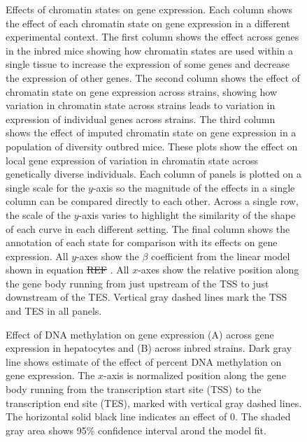 \documentclass[10pt,letterpaper]{article}
\providecommand{\DIFaddtex}[1]{{\protect\color{blue}\uwave{#1}}} %
\providecommand{\DIFdeltex}[1]{{\protect\color{red}\sout{#1}}}                      %
\providecommand{\DIFaddFL}[1]{\DIFadd{#1}} %
\providecommand{\DIFdelFL}[1]{\DIFdel{#1}} %
\providecommand{\DIFaddbeginFL}{} %
\providecommand{\DIFaddendFL}{} %
\providecommand{\DIFdelbeginFL}{} %
\providecommand{\DIFdelendFL}{} %
\providecommand{\DIFadd}[1]{\texorpdfstring{\DIFaddtex{#1}}{#1}} %
\providecommand{\DIFdel}[1]{\texorpdfstring{\DIFdeltex{#1}}{}} %
\newcommand{\DIFscaledelfig}{0.5}
\newlength{\DIFdelgraphicswidth} %
\newlength{\DIFdelgraphicsheight} %
\newcommand{\DIFaddincludegraphics}[2][]{{\color{blue}\fbox{\DIFOincludegraphics[#1]{#2}}}} %
\newcommand{\DIFdelincludegraphics}[2][]{%
\sbox{\DIFdelgraphicsbox}{\DIFOincludegraphics[#1]{#2}}%
\settoboxwidth{\DIFdelgraphicswidth}{\DIFdelgraphicsbox} %
\settoboxtotalheight{\DIFdelgraphicsheight}{\DIFdelgraphicsbox} %
\scalebox{\DIFscaledelfig}{%
\parbox[b]{\DIFdelgraphicswidth}{\usebox{\DIFdelgraphicsbox}\\[-\baselineskip] \rule{\DIFdelgraphicswidth}{0em}}\llap{\resizebox{\DIFdelgraphicswidth}{\DIFdelgraphicsheight}{%
\setlength{\unitlength}{\DIFdelgraphicswidth}%
\begin{picture}(1,1)%
\thicklines\linethickness{2pt} %
{\color[rgb]{1,0,0}\put(0,0){\framebox(1,1){}}}%
{\color[rgb]{1,0,0}\put(0,0){\line( 1,1){1}}}%
{\color[rgb]{1,0,0}\put(0,1){\line(1,-1){1}}}%
\end{picture}%
}\hspace*{3pt}}} %
} %
\DeclareRobustCommand{\DIFaddbeginFL}{\DIFOaddbeginFL \let\includegraphics\DIFaddincludegraphics} %
\DeclareRobustCommand{\DIFaddendFL}{\DIFOaddendFL \let\includegraphics\DIFOincludegraphics} %
\DeclareRobustCommand{\DIFdelbeginFL}{\DIFOdelbeginFL \let\includegraphics\DIFdelincludegraphics} %
\DeclareRobustCommand{\DIFdelendFL}{\DIFOaddendFL \let\includegraphics\DIFOincludegraphics} %
\begin{document}
\begin{figure}[ht]
\centering
\caption{Effects of chromatin states on gene expression. Each column shows 
the effect of each chromatin state on gene expression in a different 
experimental context. The first column shows the effect across genes in 
the inbred mice showing how chromatin states are used within a single 
tissue to increase the expression of some genes and decrease the expression 
of other genes. The second column shows the effect of chromatin state on 
gene expression across strains, showing how variation in chromatin state 
across strains leads to variation in expression of individual genes across 
strains. The third column shows the effect of imputed chromatin state on 
gene expression in a population of diversity outbred mice. These plots show 
the effect on local gene expression of variation in chromatin state across 
genetically diverse individuals. Each column of panels is plotted on a single 
scale for the $y$-axis so the magnitude of the effects in a single column can be 
compared directly to each other. Across a single row, the scale of the $y$-axis 
varies to highlight the similarity of the shape of each curve in each different 
setting. The final column shows the annotation of each state for comparison with
its effects on gene expression. All $y$-axes show the $\beta$ coefficient from 
the linear model shown in \DIFaddbeginFL \DIFaddFL{the }\DIFaddendFL equation\DIFdelbeginFL %
\DIFdelFL{REF}%
\DIFdelendFL . All $x$-axes show the relative 
position along the gene body running from just upstream of the TSS to just downstream 
of the TES. Vertical gray dashed lines mark the TSS and TES in all panels.}
\label{fig:state_effects}
\end{figure}

\begin{figure}[ht]
\centering
\caption{Effect of DNA methylation on gene expression (A) across gene expression
in hepatocytes and (B) across inbred strains. Dark gray line shows estimate
of the effect of percent DNA methylation on gene expression. The $x$-axis is
normalized position along the gene body running from the transcription start
site (TSS) to the transcription end site (TES), marked with vertical gray dashed
lines. The horizontal solid black line indicates an effect of 0. 
The shaded gray area shows 95\% confidence interval arond the model fit.}
\label{fig:DNA_methylation_effect}
\end{figure}
\end{document}
